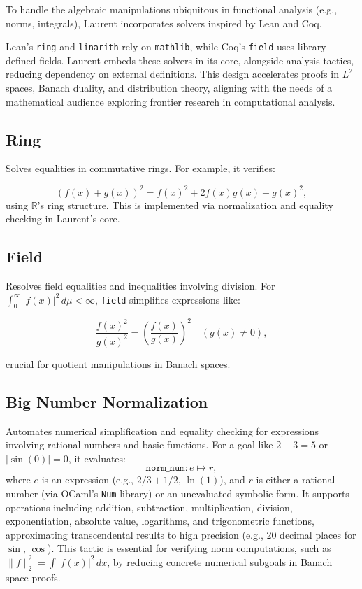 \documentclass{article}
\begin{document}
To handle the algebraic manipulations ubiquitous in functional
analysis (e.g., norms, integrals), Laurent incorporates solvers
inspired by Lean and Coq.

Lean’s \texttt{ring} and \texttt{linarith} rely on \texttt{mathlib},
while Coq’s \texttt{field} uses library-defined fields. Laurent embeds
these solvers in its core, alongside analysis tactics, reducing dependency
on external definitions. This design accelerates proofs in $L^2$ spaces,
Banach duality, and distribution theory, aligning with the needs of a
mathematical audience exploring frontier research in computational analysis.

\subsection{Ring}

Solves equalities in commutative rings. For example, it verifies:

\[ (f(x) + g(x))^2 = f(x)^2 + 2 f(x) g(x) + g(x)^2, \]
using $\mathbb{R}$’s ring structure. This is implemented via
normalization and equality checking in Laurent’s core.

\subsection{Field}

Resolves field equalities and inequalities
involving division. For $\int_0^\infty |f(x)|^2 \, d\mu < \infty$,
\texttt{field} simplifies expressions like:

\[ \frac{f(x)^2}{g(x)^2} = \left( \frac{f(x)}{g(x)} \right)^2 \quad (g(x) \neq 0), \]

crucial for quotient manipulations in Banach spaces.

\subsection{Big Number Normalization}
Automates numerical simplification and equality checking for expressions involving rational numbers and basic functions. For a goal like \( 2 + 3 = 5 \) or \( |\sin(0)| = 0 \), it evaluates:
\[
\texttt{norm\_num} : e \mapsto r,
\]
where \( e \) is an expression (e.g., \( 2/3 + 1/2 \), \( \ln(1) \)), and \( r \) is either a rational number (via OCaml's \texttt{Num} library) or an unevaluated symbolic form. It supports operations including addition, subtraction, multiplication, division, exponentiation, absolute value, logarithms, and trigonometric functions, approximating transcendental results to high precision (e.g., 20 decimal places for \( \sin \), \( \cos \)). This tactic is essential for verifying norm computations, such as \( \|f\|_2^2 = \int |f(x)|^2 \, dx \), by reducing concrete numerical subgoals in Banach space proofs.
\end{document}
